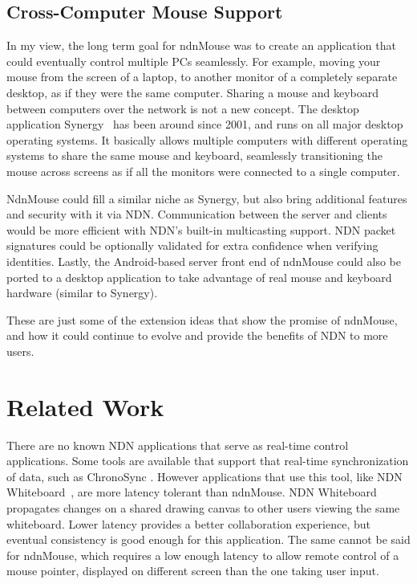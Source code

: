 \documentclass{sig-alternate}
\renewcommand\_{\textunderscore\allowbreak}  %
\begin{document}
\subsection{Cross-Computer Mouse Support}
\label{sec:crossCompMouseSupport}
In my view, the long term goal for ndnMouse was to create an application that could eventually control multiple PCs seamlessly. For example, moving your mouse from the screen of a laptop, to another monitor of a completely separate desktop, as if they were the same computer. Sharing a mouse and keyboard between computers over the network is not a new concept. The desktop application Synergy~\cite{synergy} has been around since 2001, and runs on all major desktop operating systems. It basically allows multiple computers with different operating systems to share the same mouse and keyboard, seamlessly transitioning the mouse across screens as if all the monitors were connected to a single computer.

NdnMouse could fill a similar niche as Synergy, but also bring additional features and security with it via NDN. Communication between the server and clients would be more efficient with NDN's built-in multicasting support. NDN packet signatures could be optionally validated for extra confidence when verifying identities. Lastly, the Android-based server front end of ndnMouse could also be ported to a desktop application to take advantage of real mouse and keyboard hardware (similar to Synergy).

These are just some of the extension ideas that show the promise of ndnMouse, and how it could continue to evolve and provide the benefits of NDN to more users.

\section{Related Work}
\label{sec:relatedwork}
There are no known NDN applications that serve as real-time control applications. Some tools are available that support that real-time synchronization of data, such as ChronoSync \cite{chronosync}. However applications that use this tool, like NDN Whiteboard~\cite{ndn-whiteboard}, are more latency tolerant than ndnMouse. NDN Whiteboard propagates changes on a shared drawing canvas to other users viewing the same whiteboard. Lower latency provides a better collaboration experience, but eventual consistency is good enough for this application. The same cannot be said for ndnMouse, which requires a low enough latency to allow remote control of a mouse pointer, displayed on different screen than the one taking user input.
\end{document}
